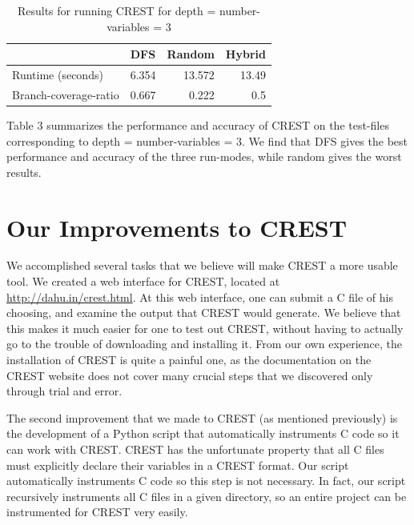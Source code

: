 \documentclass[oribibl, twocolumn]{llncs}
\begin{document}
\begin{table}[htbp]
\caption{Results for running CREST for depth = number-variables = 3}
\begin{center}
\begin{tabular}{|l|r|r|r|}
\hline
 & \multicolumn{1}{l|}{DFS} & \multicolumn{1}{l|}{Random} & \multicolumn{1}{l|}{Hybrid} \\ \hline
Runtime (seconds) & 6.354 & 13.572 & 13.49 \\ \hline
Branch-coverage-ratio & 0.667 & 0.222 & 0.5 \\ \hline
\end{tabular}
\end{center}
\label{DFS timings (in seconds)}
\end{table}


Table 3 summarizes the performance and accuracy of CREST on the test-files corresponding to depth = number-variables = 3. We find that DFS gives the best performance and accuracy of the three run-modes, while random gives the worst results.

\section{Our Improvements to CREST}
\label{sctn:Improvements}
We accomplished several tasks that we believe will make CREST a more usable tool. We created a web interface for CREST, located at \url{http://dahu.in/crest.html}. At this web interface, one can submit a C file of his choosing, and examine the output that CREST would generate. We believe that this makes it much easier for one to test out CREST, without having to actually go to the trouble of downloading and installing it. From our own experience, the installation of CREST is quite a painful one, as the documentation on the CREST website does not cover many crucial steps that we discovered only through trial and error.

The second improvement that we made to CREST (as mentioned previously) is the development of a Python script that automatically instruments C code so it can work with CREST. CREST has the unfortunate property that all C files must explicitly declare their variables in a CREST format. Our script automatically instruments C code so this step is not necessary. In fact, our script recursively instruments all C files in a given directory, so an entire project can be instrumented for CREST very easily.

\end{document}
